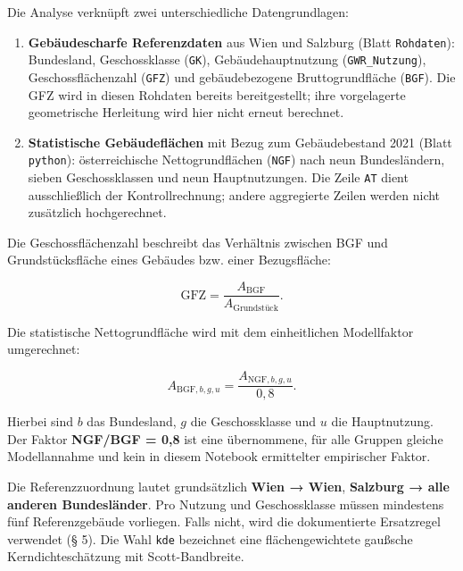 \documentclass[
  ngerman,
  a4paper,
  DIV=11]{scrreprt}
\providecommand{\tightlist}{%
  \setlength{\itemsep}{0pt}\setlength{\parskip}{0pt}}
\begin{document}
Die Analyse verknüpft zwei unterschiedliche Datengrundlagen:

\begin{enumerate}
\def\labelenumi{\arabic{enumi}.}
\tightlist
\item
  \textbf{Gebäudescharfe Referenzdaten} aus Wien und Salzburg (Blatt
  \texttt{Rohdaten}): Bundesland, Geschossklasse (\texttt{GK}),
  Gebäudehauptnutzung (\texttt{GWR\_Nutzung}), Geschossflächenzahl
  (\texttt{GFZ}) und gebäudebezogene Bruttogrundfläche (\texttt{BGF}).
  Die GFZ wird in diesen Rohdaten bereits bereitgestellt; ihre
  vorgelagerte geometrische Herleitung wird hier nicht erneut berechnet.
\item
  \textbf{Statistische Gebäudeflächen} mit Bezug zum Gebäudebestand 2021
  (Blatt \texttt{python}): österreichische Nettogrundflächen
  (\texttt{NGF}) nach neun Bundesländern, sieben Geschossklassen und
  neun Hauptnutzungen. Die Zeile \texttt{AT} dient ausschließlich der
  Kontrollrechnung; andere aggregierte Zeilen werden nicht zusätzlich
  hochgerechnet.
\end{enumerate}

Die Geschossflächenzahl beschreibt das Verhältnis zwischen BGF und
Grundstücksfläche eines Gebäudes bzw. einer Bezugsfläche:

\[\mathrm{GFZ}=\frac{A_{\mathrm{BGF}}}{A_{\mathrm{Grundstück}}}.\]

Die statistische Nettogrundfläche wird mit dem einheitlichen
Modellfaktor umgerechnet:

\[ A_{\mathrm{BGF},b,g,u}= \frac{A_{\mathrm{NGF},b,g,u}}{0{,}8}. \]

Hierbei sind \(b\) das Bundesland, \(g\) die Geschossklasse und \(u\)
die Hauptnutzung. Der Faktor \textbf{NGF/BGF = 0,8} ist eine
übernommene, für alle Gruppen gleiche Modellannahme und kein in diesem
Notebook ermittelter empirischer Faktor.

Die Referenzzuordnung lautet grundsätzlich \textbf{Wien → Wien},
\textbf{Salzburg → alle anderen Bundesländer}. Pro Nutzung und
Geschossklasse müssen mindestens fünf Referenzgebäude vorliegen. Falls
nicht, wird die dokumentierte Ersatzregel verwendet (§ 5). Die Wahl
\texttt{kde} bezeichnet eine flächengewichtete gaußsche
Kerndichteschätzung mit Scott-Bandbreite.
\end{document}
